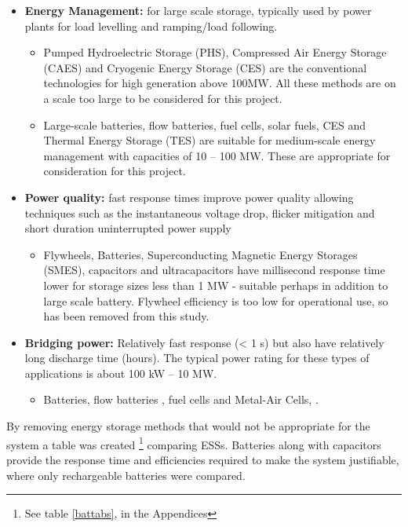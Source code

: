 \begin{itemize}
\tightlist
\item
  \textbf{Energy Management:} for large scale storage, typically used by
  power plants for load levelling and ramping/load following.

  \begin{itemize}
  \tightlist
  \item
    Pumped Hydroelectric Storage (PHS), Compressed Air Energy Storage
    (CAES) and Cryogenic Energy Storage (CES) are the conventional
    technologies for high generation above 100MW. All these methods are
    on a scale too large to be considered for this project.
  \item
    Large-scale batteries, flow batteries, fuel cells, solar fuels, CES
    and Thermal Energy Storage (TES) are suitable for medium-scale
    energy management with capacities of 10 -- 100 MW. These are
    appropriate for consideration for this project.
  \end{itemize}
\item
  \textbf{Power quality:} fast response times improve power quality
  allowing techniques such as the instantaneous voltage drop, flicker
  mitigation and short duration uninterrupted power supply

  \begin{itemize}
  \tightlist
  \item
    Flywheels, Batteries, Superconducting Magnetic Energy Storages
    (SMES), capacitors and ultracapacitors have millisecond response
    time lower for storage sizes less than 1 MW - suitable perhaps in
    addition to large scale battery. Flywheel efficiency is too low for
    operational use, so has been removed from this study.
  \end{itemize}
\item
  \textbf{Bridging power:} Relatively fast response (\textless{} 1 s)
  but also have relatively long discharge time (hours). The typical
  power rating for these types of applications is about 100 kW -- 10 MW.

  \begin{itemize}
  \tightlist
  \item
    Batteries, flow batteries \cite{flowbatstan}, fuel cells and
    Metal-Air Cells\cite{Chen2009291}, \cite{batuni}.
  \end{itemize}
\end{itemize}

By removing energy storage methods that would not be appropriate for the
system a table was created
\footnote{See table \ref{battabs}, in the Appendices} comparing ESSs.
Batteries along with capacitors provide the response time
\cite{Choudar201521} and efficiencies required to make the system
justifiable, where only rechargeable batteries were compared.

